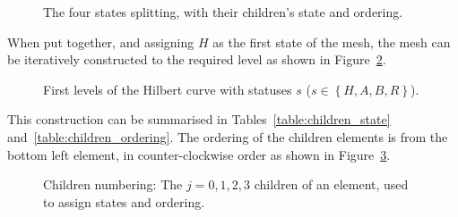 \begin{figure}[H]
    \centering
    \hfill
    \hfill
    \hfill
    \caption{The four states splitting, with their children's state and ordering.}\label{fig:hilbert_splits}
\end{figure}

\noindent
When put together, and assigning \(H\) as the first state of the mesh, the mesh can be iteratively
constructed to the required level as shown in Figure~\ref{fig:hilbert_levels}.

\begin{figure}[H]
    \centering
    \subfloat[Level 0]
    {\label{fig:hilbert_l0}}
    \hfill
    \subfloat[Level 1]
    {\label{fig:hilbert_l1}}
    \hfill
    \subfloat[Level 2]
    {\label{fig:hilbert_l2}}
    \caption{First levels of the Hilbert curve with statuses \(s\) (\(s \in \left \{ H, A , B , R \right \} \)).}\label{fig:hilbert_levels}
\end{figure}

\noindent
This construction can be summarised in Tables~\ref{table:children_state}
and~\ref{table:children_ordering}. The ordering of the children elements is from the bottom left
element, in counter-clockwise order as shown in Figure~\ref{fig:child_order}. 

\begin{figure}[H]
    \centering
    
    \caption{Children numbering: The \(j = 0, 1, 2, 3\) children of an element, used to assign states and ordering.}\label{fig:child_order}
\end{figure}


